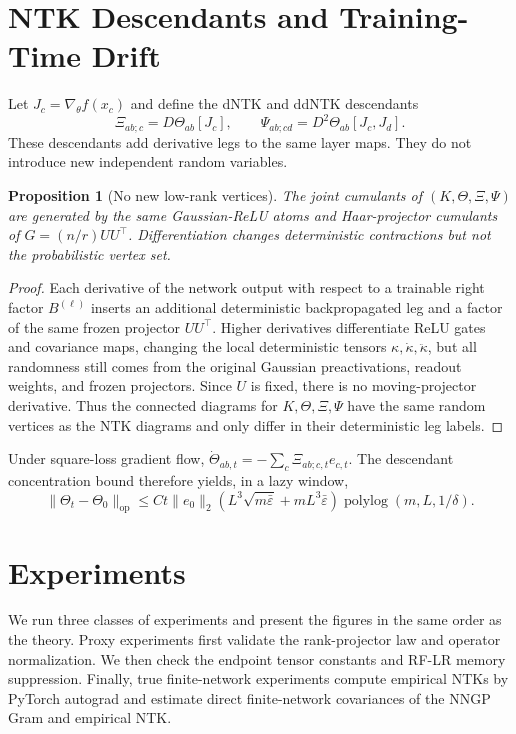 \documentclass{article}
\newtheorem{proposition}[theorem]{Proposition}
\newcommand{\op}{\mathrm{op}}
\newcommand{\barE}{\bar\varepsilon}
\begin{document}
\section{NTK Descendants and Training-Time Drift}
Let \(J_c=\nabla_\theta f(x_c)\) and define the dNTK and ddNTK descendants
\begin{equation}
\Xi_{ab;c}=D\Theta_{ab}[J_c],
\qquad
\Psi_{ab;cd}=D^2\Theta_{ab}[J_c,J_d].
\end{equation}
These descendants add derivative legs to the same layer maps. They do not introduce new independent random variables.

\begin{proposition}[No new low-rank vertices]
\label{prop:no-new-vertices}
The joint cumulants of \((K,\Theta,\Xi,\Psi)\) are generated by the same Gaussian-ReLU atoms and Haar-projector cumulants of \(G=(n/r)UU^\top\). Differentiation changes deterministic contractions but not the probabilistic vertex set.
\end{proposition}

\begin{proof}
Each derivative of the network output with respect to a trainable right factor \(B^{(\ell)}\) inserts an additional deterministic backpropagated leg and a factor of the same frozen projector \(UU^\top\). Higher derivatives differentiate ReLU gates and covariance maps, changing the local deterministic tensors \(\kappa,\dot\kappa,\ddot\kappa\), but all randomness still comes from the original Gaussian preactivations, readout weights, and frozen projectors. Since \(U\) is fixed, there is no moving-projector derivative. Thus the connected diagrams for \(K,\Theta,\Xi,\Psi\) have the same random vertices as the NTK diagrams and only differ in their deterministic leg labels.
\end{proof}

Under square-loss gradient flow, \(\dot\Theta_{ab,t}=-\sum_c\Xi_{ab;c,t}e_{c,t}\). The descendant concentration bound therefore yields, in a lazy window,
\begin{equation}
\|\Theta_t-\Theta_0\|_{\op}
\le
C t\|e_0\|_2\left(L^3\sqrt{m\barE}+mL^3\barE\right)\operatorname{polylog}(m,L,1/\delta).
\end{equation}

\section{Experiments}
We run three classes of experiments and present the figures in the same order as the theory. Proxy experiments first validate the rank-projector law and operator normalization. We then check the endpoint tensor constants and RF-LR memory suppression. Finally, true finite-network experiments compute empirical NTKs by PyTorch autograd and estimate direct finite-network covariances of the NNGP Gram and empirical NTK.
\end{document}
